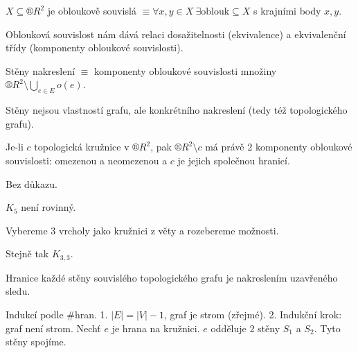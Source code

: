\documentclass[12pt]{article}					%
\begin{document}
        \begin{definice}
            $X \subseteq ®R^2$ je obloukově souvislá $≡ \forall x, y \in X\ \exists\text{oblouk}\subseteq X$ s krajními body $x, y$.

            Oblouková souvislost nám dává relaci dosažitelnosti (ekvivalence) a ekvivalenční třídy (komponenty obloukové souvislosti).
        \end{definice}

        \begin{definice}
            Stěny nakreslení $≡$ komponenty obloukové souvislosti množiny $®R^2 \setminus \bigcup_{e \in E} o(e)$.
        \end{definice}

        \begin{upozorneni}
            Stěny nejsou vlastností grafu, ale konkrétního nakreslení (tedy též topologického grafu).
        \end{upozorneni}

        
        \begin{veta}
            Je-li $c$ topologická kružnice v $®R^2$, pak $®R^2\setminus c$ má právě 2 komponenty obloukové souvislosti: omezenou a neomezenou a $c$ je jejich společnou hranicí.
            \begin{dukazin}
                Bez důkazu.
            \end{dukazin}
        \end{veta}

        \begin{dusledek}
            $K_5$ není rovinný.
            \begin{dukazin}
                Vybereme 3 vrcholy jako kružnici z věty a rozebereme možnosti.
            \end{dukazin}
            \begin{poznamkain}
                Stejně tak $K_{3, 3}$.
            \end{poznamkain}
        \end{dusledek}

        \begin{veta}
            Hranice každé stěny souvislého topologického grafu je nakreslením uzavřeného sledu.

            \begin{dukazin}
                Indukcí podle \#hran. 1. $|E| = |V|-1$, graf je strom (zřejmé). 2. Indukční krok: graf není strom. Nechť $e$ je hrana na kružnici. $e$ odděluje 2 stěny $S_1$ a $S_2$. Tyto stěny spojíme.
            \end{dukazin}
        \end{veta}
\end{document}
